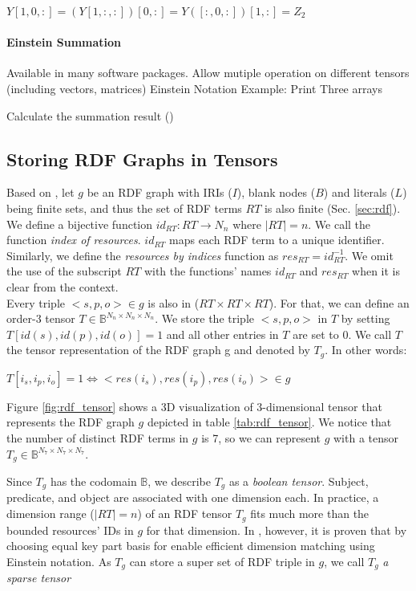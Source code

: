 \centerline{$Y[1, 0, :] = (Y[1, :, :])[0, :] = Y([:, 0, :])[1, :] = Z_2$}

\paragraph{Einstein Summation}
\label{einstein_summation}
Available in many software packages.
Allow mutiple operation on different tensors (including vectors, matrices)
Einstein Notation Example:
Print Three arrays

Calculate the summation result ()

\subsection{Storing RDF Graphs in Tensors}
\label{sec:rdf_tensor}
Based on \cite{tentris2020}, let $g$ be an RDF graph with IRIs ($I$), blank nodes ($B$) and literals ($L$) being finite sets, and thus the set of RDF terms $RT$ is also finite (Sec. \ref{sec:rdf}). We define a bijective function $id_{RT}: RT \to N_n$ where $|RT|=n$. We call the function \textit{index of resources}. $id_{RT}$ maps each RDF term to a unique identifier. Similarly, we define the \textit{resources by indices} function as $res_{RT} = id_{RT}^{-1}$. 
We omit the use of the subscript $RT$ with the functions' names $id_{RT}$ and $res_{RT}$ when it is clear from the context. \\

Every triple $<s, p, o> \in g$ is also in ($RT \times RT \times RT$). For that, we can define an order-3 tensor $T \in \mathbb{B}^{N_n \times N_n \times N_n}$. We store the triple $<s, p, o>$ in $T$ by setting $T[id(s), id(p), id(o)] = 1$ and all other entries in $T$ are set to 0. We call $T$ the tensor representation of the RDF graph g and denoted by $T_g$. In other words: \\
\centerline{$T[i_s, i_p, i_o] = 1 \iff <res(i_s), res(i_p), res(i_o)> \in g$}

\begin{example}
	\label{ex:rdf_tensor}
Figure \ref{fig:rdf_tensor} shows a 3D visualization of 3-dimensional tensor that represents the RDF graph $g$ depicted in table \ref{tab:rdf_tensor}. We notice that the number of distinct RDF terms in $g$ is 7, so we can represent $g$ with a tensor $T_g \in \mathbb{B}^{N_7 \times N_7 \times N_7}$. 
\end{example}

Since $T_g$ has the codomain $\mathbb{B}$, we describe $T_g$ as a \textit{boolean tensor}. Subject, predicate, and object are associated with one dimension each. In practice, a dimension range  ($|RT| =n$) of an RDF tensor $T_g$ fits much more than the bounded resources' IDs in $g$ for that dimension. In \cite{tentris2020}, however, it is proven that by choosing equal key part basis for enable efficient dimension matching using Einstein notation. As $T_g$ can store a super set of RDF triple in $g$, we call $T_g$ \textit{a sparse tensor}

